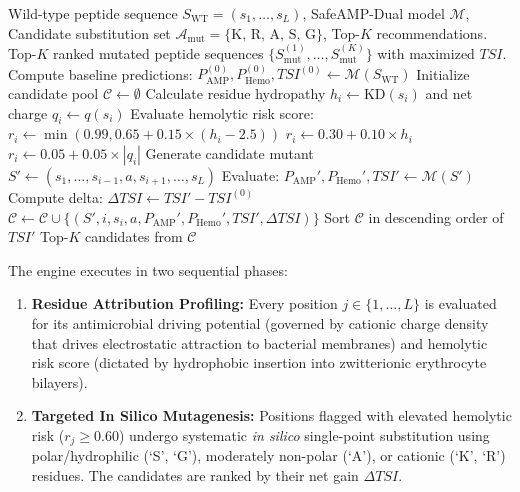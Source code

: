 \documentclass[11pt,a4paper]{article}
\begin{document}
\begin{algorithm}[htbp]
\caption{SafeAMP-Dual \textit{In Silico} Directed Evolution and Detoxification Engine}
\label{alg:evolution}
\begin{algorithmic}[1]
\REQUIRE Wild-type peptide sequence $S_{\text{WT}} = (s_1, \dots, s_L)$, SafeAMP-Dual model $\mathcal{M}$, Candidate substitution set $\mathcal{A}_{\text{mut}} = \{\text{K, R, A, S, G}\}$, Top-$K$ recommendations.
\ENSURE Top-$K$ ranked mutated peptide sequences $\{S_{\text{mut}}^{(1)}, \dots, S_{\text{mut}}^{(K)}\}$ with maximized $TSI$.
\STATE Compute baseline predictions: $P_{\text{AMP}}^{(0)}, P_{\text{Hemo}}^{(0)}, TSI^{(0)} \leftarrow \mathcal{M}(S_{\text{WT}})$
\STATE Initialize candidate pool $\mathcal{C} \leftarrow \emptyset$
    \STATE Calculate residue hydropathy $h_i \leftarrow \text{KD}(s_i)$ and net charge $q_i \leftarrow q(s_i)$
    \STATE Evaluate hemolytic risk score:
        \STATE $r_i \leftarrow \min(0.99, 0.65 + 0.15 \times (h_i - 2.5))$ 
        \STATE $r_i \leftarrow 0.30 + 0.10 \times h_i$ 
    \ELSE
        \STATE $r_i \leftarrow 0.05 + 0.05 \times |q_i|$ 
    \ENDIF
            \STATE Generate candidate mutant $S' \leftarrow (s_1, \dots, s_{i-1}, a, s_{i+1}, \dots, s_L)$
            \STATE Evaluate: $P_{\text{AMP}}', P_{\text{Hemo}}', TSI' \leftarrow \mathcal{M}(S')$
            \STATE Compute delta: $\Delta TSI \leftarrow TSI' - TSI^{(0)}$
            \STATE $\mathcal{C} \leftarrow \mathcal{C} \cup \{(S', i, s_i, a, P_{\text{AMP}}', P_{\text{Hemo}}', TSI', \Delta TSI)\}$
        \ENDFOR
    \ENDIF
\ENDFOR
\STATE Sort $\mathcal{C}$ in descending order of $TSI'$
\RETURN Top-$K$ candidates from $\mathcal{C}$
\end{algorithmic}
\end{algorithm}

The engine executes in two sequential phases:
\begin{enumerate}
    \item \textbf{Residue Attribution Profiling:} Every position $j \in \{1, \dots, L\}$ is evaluated for its antimicrobial driving potential (governed by cationic charge density that drives electrostatic attraction to bacterial membranes) and hemolytic risk score (dictated by hydrophobic insertion into zwitterionic erythrocyte bilayers).
    \item \textbf{Targeted In Silico Mutagenesis:} Positions flagged with elevated hemolytic risk ($r_j \ge 0.60$) undergo systematic \textit{in silico} single-point substitution using polar/hydrophilic (`S', `G'), moderately non-polar (`A'), or cationic (`K', `R') residues. The candidates are ranked by their net gain $\Delta TSI$.
\end{enumerate}
\end{document}
